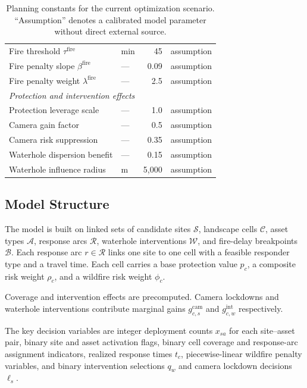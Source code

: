 \begin{table}[H]
\begin{tabular}{llrl}
Fire threshold $\tau^{\mathrm{fire}}$ & min & 45 & assumption \\
Fire penalty slope $\beta^{\mathrm{fire}}$ & --- & 0.09 & assumption \\
Fire penalty weight $\lambda^{\mathrm{fire}}$ & --- & 2.5 & assumption \\[3pt]
\multicolumn{4}{l}{\textit{Protection and intervention effects}} \\
Protection leverage scale & --- & 1.0 & assumption \\
Camera gain factor & --- & 0.5 & assumption \\
Camera risk suppression & --- & 0.35 & assumption \\
Waterhole dispersion benefit & --- & 0.15 & assumption \\
Waterhole influence radius & m & 5{,}000 & assumption \\
\hline
\end{tabular}
\caption{Planning constants for the current optimization scenario. ``Assumption'' denotes a calibrated model parameter without direct external source.}
\label{tab:optimization_constants}
\end{table}

\subsection{Model Structure}

The model is built on linked sets of candidate sites $\mathcal{S}$, landscape cells $\mathcal{C}$, asset types $\mathcal{A}$, response arcs $\mathcal{R}$, waterhole interventions $\mathcal{W}$, and fire-delay breakpoints $\mathcal{B}$. Each response arc $r \in \mathcal{R}$ links one site to one cell with a feasible responder type and a travel time. Each cell carries a base protection value $p_c$, a composite risk weight $\rho_c$, and a wildfire risk weight $\phi_c$.

Coverage and intervention effects are precomputed. Camera lockdowns and waterhole interventions contribute marginal gains $g^{\mathrm{cam}}_{c,s}$ and $g^{\mathrm{int}}_{c,w}$ respectively.

The key decision variables are integer deployment counts $x_{sa}$ for each site--asset pair, binary site and asset activation flags, binary cell coverage and response-arc assignment indicators, realized response times $t_c$, piecewise-linear wildfire penalty variables, and binary intervention selections $q_w$ and camera lockdown decisions $\ell_s$.

